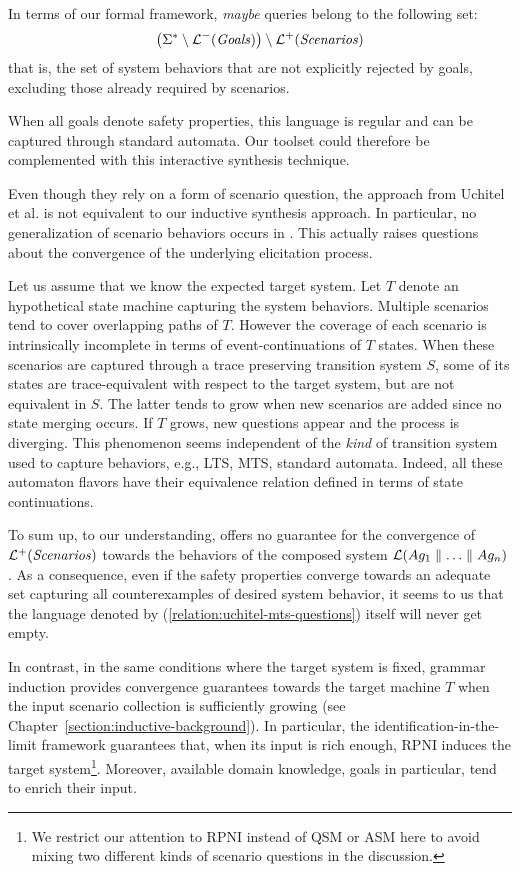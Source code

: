 In terms of our formal framework, \emph{maybe} queries belong to the following set:
\begin{align}
\left( \Sigma^* \setminus \mathcal{L}^-(\mbox{\emph{Goals}}) \right) \setminus \mathcal{L}^+(\mbox{\emph{Scenarios}})
\label{relation:uchitel-mts-questions}
\end{align}
that is, the set of system behaviors that are not explicitly rejected by goals, excluding those already required by scenarios.

When all goals denote safety properties, this language is regular and can be captured through standard automata. Our toolset could therefore be complemented with this interactive synthesis technique.

Even though they rely on a form of scenario question, the approach from Uchitel et al. is not equivalent to our inductive synthesis approach. In particular, no generalization of scenario behaviors occurs in \cite{Uchitel:2007, Uchitel:2009}. This actually raises questions about the convergence of the underlying elicitation process. 

Let us assume that we know the expected target system. Let $T$ denote an hypothetical state machine capturing the system behaviors. Multiple scenarios tend to cover overlapping paths of $T$. However the coverage of each scenario is intrinsically incomplete in terms of event-continuations of $T$ states. When these scenarios are captured through a trace preserving transition system $S$, some of its states are trace-equivalent with respect to the target system, but are not equivalent in $S$. The latter tends to grow when new scenarios are added since no state merging occurs. If $T$ grows, new questions appear and the process is diverging. This phenomenon seems independent of the \emph{kind} of transition system used to capture behaviors, e.g., LTS, MTS, standard automata. Indeed, all these automaton flavors have their equivalence relation defined in terms of state continuations.

To sum up, to our understanding, \cite{Uchitel:2009} offers no guarantee for the convergence of $\mathcal{L}^+(\mbox{\emph{Scenarios}})$ towards the behaviors of the composed system $\mathcal{L}(Ag_1 \parallel \ldots \parallel Ag_n)$. As a consequence, even if the safety properties converge towards an adequate set capturing all counterexamples of desired system behavior, it seems to us that the language denoted by (\ref{relation:uchitel-mts-questions}) itself will never get empty. 

In contrast, in the same conditions where the target system is fixed, grammar induction provides convergence guarantees towards the target machine $T$ when the input scenario collection is sufficiently growing \cite{Oncina:1993} (see Chapter~\ref{section:inductive-background}). In particular, the identification-in-the-limit framework guarantees that, when its input is rich enough, RPNI induces the target system\footnote{We restrict our attention to RPNI instead of QSM or ASM here to avoid mixing two different kinds of scenario questions in the discussion.}. Moreover, available domain knowledge, goals in particular, tend to enrich their input.

